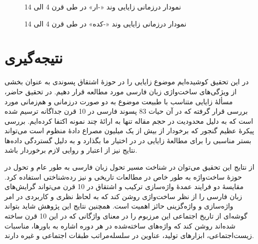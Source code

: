 \documentclass[12pt,onecolumn,a4paper]{article}
\begin{document}
    \begin{figure}[H]
        \centering
        \caption{نمودار درزمانی زایایی وند «-ار» در طی قرن 4 الی 14}
        \label{fig:3}
    \end{figure}

    \begin{figure}[H]
        \centering
        \caption{نمودار درزمانی زایایی وند «-کده» در طی قرن 4 الی 14}
        \label{fig:4}
    \end{figure}

    \section{نتیجه‌گیری}
    در این تحقیق کوشیده‌ایم موضوع زایایی را در حوزهٔ اشتقاق پسوندی به عنوان بخشی از ویژگی‌های ساخت‌واژی زبان فارسی مورد مطالعه قرار دهیم. در تحقیق حاضر، مسألهٔ زایایی متناسب با طبیعت موضوع به دو صورت درزمانی و هم‌زمانی مورد بررسی قرار گرفته که در آن حیات 83 پسوند فارسی در 10 قرن جداگانه ترسیم شده است که به دلیل محدودیت در حجم مقاله تنها به ارائهٔ چند نمونه اکتفا کرده‌ایم. بررسی پیکرهٔ عظیم گنجور که برخودار از بیش از یک میلیون مصراع دادهٔ منظوم است می‌تواند بستر مناسبی را برای مطالعهٔ زایایی در در اختیار ما بگذارد و به دلیل گستردگی داده‌ها نتایج نیز از اعتبار و روایی لازم برخوردار باشد.
    \par
    از نتایج این تحقیق می‌توان در شناخت مسیر تحول زبان فارسی به طور عام و تحول در حوزهٔ ساخت‌واژه به طور خاص در مطالعات تاریخی و نیز رده‌شناختی استفاده کرد. مقایسهٔ دو فرایند عمدهٔ واژه‌سازی ترکیب و اشتقاق در 10 قرن می‌تواند گرایش‌های زبان فارسی را از نظر ساخت‌واژی روشن کند که به لحاظ نظری و کاربردی در امر واژه‌سازی و واژه‌گزینی حائز اهمیت است. همچنین نتایج این پژوهش شاید بتواند گوشه‌ای از تاریخ اجتماعی این مرزبوم را در معنای واژگانی که در این 10 قرن ساخته شده‌اند روشن کند که واژه‌های ساخته‌شده در هر دوره اشاره به باورها، مناسبات‌ زیست‌اجتماعی، ابزارهای تولید، عناوین در سلسله‌مراتب طبقات اجتماعی و غیره دارند.

    {\mfo
    
    }
\end{document}
